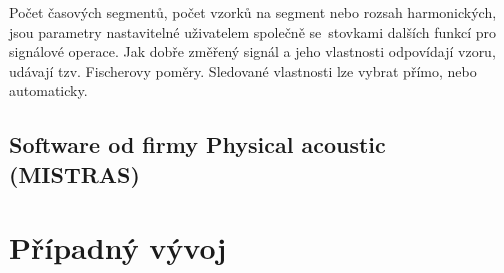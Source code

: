 Počet časových segmentů, počet 
vzorků na segment nebo rozsah harmonických,
jsou parametry nastavitelné uživatelem společně 
se~stovkami dalších funkcí pro signálové operace.
Jak dobře změřený signál a jeho vlastnosti odpovídají
vzoru, udávají tzv. Fischerovy poměry. 
Sledované vlastnosti lze vybrat přímo, nebo 
automaticky.
 
\subsection{Software od firmy Physical acoustic (MISTRAS)}

\section{Případný vývoj}







